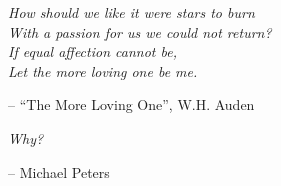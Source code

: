 \documentclass[\main/thesis.tex]{subfiles}
\begin{document}
\begin{quotepage}
\vspace*{1in}
\noindent
\emph{How should we like it were stars to burn}\\
\emph{With a passion for us we could not return?}\\
\emph{If equal affection cannot be,}\\
\emph{Let the more loving one be me.}\\
\begin{flushright}
-- ``The More Loving One'', W.H. Auden
\end{flushright}


\vspace*{1in}
\noindent
\emph{Why?}\\
\begin{flushright}
-- Michael Peters
\end{flushright}


\end{quotepage}
\end{document}

